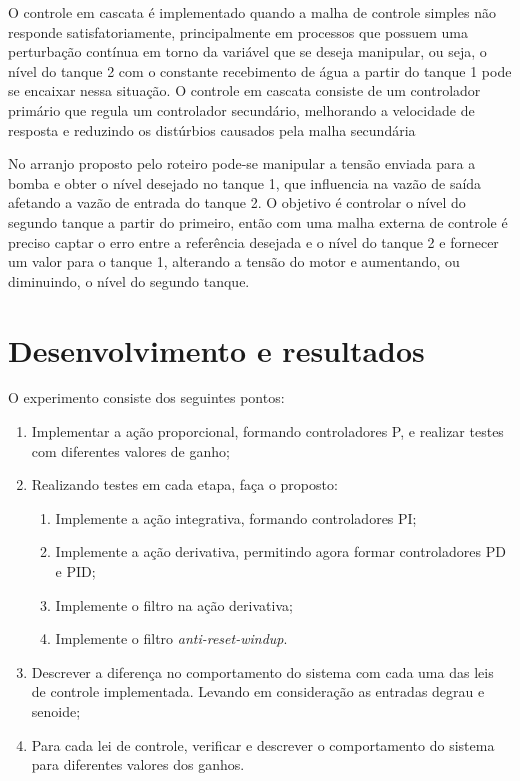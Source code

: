 \documentclass[
	12pt,				%
	openany,			%
	oneside,			%
	a4paper,			%
	english,			%
	french,				%
	spanish,			%
	brazil,				%
	]{abntex2}
\begin{document}
{O controle em cascata é implementado quando a malha de controle simples não responde satisfatoriamente, principalmente em processos que possuem uma perturbação contínua em torno da variável que se deseja manipular, ou seja, o nível do tanque 2 com o constante recebimento de água a partir do tanque 1 pode se encaixar nessa situação. O controle em cascata consiste de um controlador primário que regula um controlador secundário, melhorando a velocidade de resposta e reduzindo os distúrbios causados pela malha secundária

No arranjo proposto pelo roteiro pode-se manipular a tensão enviada para a bomba e obter o nível desejado no tanque 1, que influencia na vazão de saída afetando a vazão de entrada do tanque 2. O objetivo é controlar o nível do segundo tanque a partir do primeiro, então com uma malha externa de controle é preciso captar o erro entre a referência desejada e o nível do tanque 2 e fornecer um valor para o tanque 1, alterando a tensão do motor e aumentando, ou diminuindo, o nível do segundo tanque.
\chapter{Desenvolvimento e resultados}

O experimento consiste dos seguintes pontos:
\begin{enumerate}
    \item Implementar a ação proporcional, formando controladores P, e realizar testes com diferentes valores de ganho;
    \item Realizando testes em cada etapa, faça o proposto:
    \begin{enumerate}
        \item Implemente a ação integrativa, formando controladores PI;
        \item Implemente a ação derivativa, permitindo agora formar controladores PD e PID;
        \item Implemente o filtro na ação derivativa;
        \item Implemente o filtro \textit{anti-reset-windup}.
    \end{enumerate}
    \item Descrever a diferença no comportamento do sistema com cada uma das leis de controle implementada. Levando em consideração as entradas degrau e senoide;
    \item Para cada lei de controle, verificar e descrever o comportamento do sistema para diferentes valores dos ganhos.
\end{enumerate}
}
\end{document}
